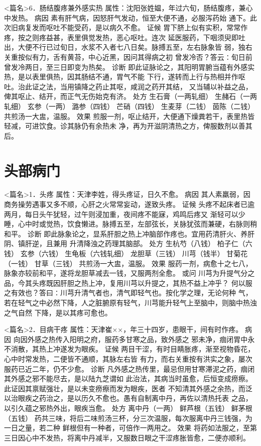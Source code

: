 \documentclass[a4paper,12pt,UTF8,twoside]{ctexbook}
\begin{document}
<篇名>6．肠结腹疼兼外感实热
属性：沈阳张姓媪，年过六旬，肠结腹疼，兼心中发热。 
病因 素有肝气病，因怒肝气发动，恒至大便不通，必服泻药始 
通下。此次旧病复发而呕吐不能受药，是以病久不愈。 
证候 胃下脐上似有实积，常常作疼，按之则疼益甚，表里俱觉发热，恶心呕吐。连次 
延医服药，下咽须臾即吐出，大便不行已过旬日，水浆不入者七八日矣。脉搏五至，左右脉象皆 
弱，独右关重按似有力，舌有黄苔，中心近黑，因问其得病之初 
曾发冷否？答云∶旬日前曾发冷两日，至三日即变为热矣。 
诊断 即此证脉论之，其阳明胃腑当蕴有外感实热，是以表里俱热，因其肠结不通，胃气不能 
下行，遂转而上行与热相并作呕吐。治此证之法，当用镇降之药止其呕，咸润之药开其结， 
又当辅以补益之品，俾其呕止、结开，而正气无伤始克有济。 
处方 生石膏（一两轧细） 生赭石（一两轧细） 玄参（一两） 潞参（四钱） 
芒硝（四钱） 生麦芽（二钱） 茵陈（二钱） 
共煎汤一大盅，温服。 
效果 煎服一剂，呕止结开，大便通下燥粪若干，表里热皆轻减，可进饮食。诊其脉仍有余热未 
净，再为开滋阴清热之方，俾服数剂以善其后。 

\chapter{头部病门}
<篇名>1．头疼
属性：天津李姓，得头疼证，日久不愈。 
病因 其人素羸弱，因商务操劳遇事又多不顺，心肝之火常常妄动，遂致头疼。 
证候 头疼不起床者已逾两月，每日头午犹轻，过午则浸加重，夜间疼不能寐，鸡鸣后疼又 
渐轻可以少睡，心中时或觉热，饮食懒进。脉搏五至，左部弦长，关脉犹弦而兼硬，右脉则稍和平。 
诊断 即此脉象论之，显系肝胆之热上冲脑部作疼也。宜用药清肝火、养肝阴、镇肝逆，且兼用 
升清降浊之药理其脑部。 
处方 生杭芍（八钱） 柏子仁（六钱） 玄参（六钱） 生龟板（六钱轧细） 
龙胆草（三钱） 川芎（钱半） 甘菊花（一钱） 甘草（三钱） 
共煎汤一大盅，温服。 
效果 服药一剂，病愈十之七八，脉象亦较前和平，遂将龙胆草减去一钱，又服两剂全愈。 
或问 川芎为升提气分之品，今其头疼既因肝胆之热上冲，复用川芎以升提之，其热不益上冲乎？ 
何以服之有效也？答曰∶川芎升清气者也，清气即轻气也。按化学之理，无论何种 
气，若在轻气之中必然下降，人之脏腑原有轻气，川芎能升轻气上至脑中，则脑中热浊之气自然 
下降，是以其疼可愈也。 


<篇名>2．目病干疼
属性：天津崔××，年三十四岁，患眼干，间有时作疼。 
病因 向因外感之热传入阳明之府，服药多甘寒之品，致外感之 
邪未净，痼闭胃中永不消散，其热上冲遂发为眼疾。 
证候 两目干涩，有时目睛胀疼，渐至视物昏花，心中时常发热，二便皆不通顺，其脉左右皆 
有力，而右关重按有洪实之象，屡次服药已近二年，仍不少愈。 
诊断 凡外感之热传里，最忌但用甘寒滞泥之药，痼闭其外感之邪不能尽去，是以陆九芝谓如 
此治法，其病当时虽愈，后恒变成痨瘵。此证因其禀赋强壮，是以未变痨瘵而发为眼疾，医者 
不知清其外感之余热，而泛以治眼疾之药治之，是以历久不愈也。愚有自制离中丹，再佐以清热托表 
之品，以引久蕴之邪热外出，眼疾当愈。 
处方 离中丹（一两） 鲜芦根（五钱） 鲜茅根（五钱） 
药共三味，将后二味煎汤三杯，分三次温服，每次服离中丹三钱强，为一日之量，若二种 
鲜根但有一种者，可倍作一两用之。 
效果 将药如法服之，至第三日因心中不发热，将离中丹减半，又服数日眼之干涩疼胀皆愈，二便亦顺利。 
\end{document}
